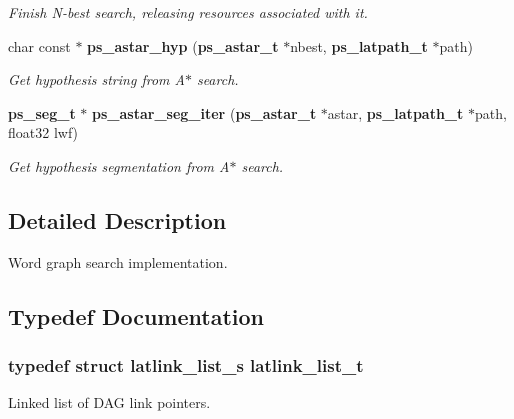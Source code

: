 \begin{DoxyCompactItemize}
\begin{DoxyCompactList}\small\item\em Finish N-\/best search, releasing resources associated with it. \end{DoxyCompactList}\item 
char const $\ast$ {\bf ps\+\_\+astar\+\_\+hyp} ({\bf ps\+\_\+astar\+\_\+t} $\ast$nbest, {\bf ps\+\_\+latpath\+\_\+t} $\ast$path)\label{ps__lattice__internal_8h_ac7372b5c5ec111f6814ce1ba495593e4}

\begin{DoxyCompactList}\small\item\em Get hypothesis string from A$\ast$ search. \end{DoxyCompactList}\item 
{\bf ps\+\_\+seg\+\_\+t} $\ast$ {\bf ps\+\_\+astar\+\_\+seg\+\_\+iter} ({\bf ps\+\_\+astar\+\_\+t} $\ast$astar, {\bf ps\+\_\+latpath\+\_\+t} $\ast$path, float32 lwf)\label{ps__lattice__internal_8h_ac8e3dff7276c03c93377d0cb79fbdbd7}

\begin{DoxyCompactList}\small\item\em Get hypothesis segmentation from A$\ast$ search. \end{DoxyCompactList}\end{DoxyCompactItemize}


\subsection{Detailed Description}
Word graph search implementation. 



\subsection{Typedef Documentation}
\subsubsection[{latlink\+\_\+list\+\_\+t}]{\setlength{\rightskip}{0pt plus 5cm}typedef struct {\bf latlink\+\_\+list\+\_\+s}  {\bf latlink\+\_\+list\+\_\+t}}\label{ps__lattice__internal_8h_a32dd9511afc2f024dc63c9c060261e94}


Linked list of D\+A\+G link pointers. 

